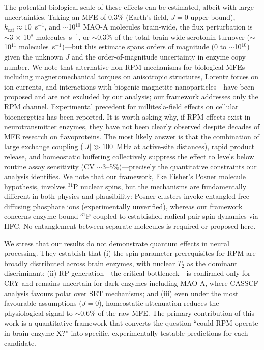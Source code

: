 \documentclass[11pt]{article}
\begin{document}
The potential biological scale of these effects can be estimated, albeit with large uncertainties. Taking an MFE of 0.3\% (Earth's field, $J = 0$ upper bound), $k_\mathrm{cat} \approx 10$~s$^{-1}$\cite{Edmondson2004main}, and $\sim$10$^{10}$ MAO-A molecules brain-wide, the flux perturbation is $\sim$3 $\times$ 10$^8$ molecules~s$^{-1}$, or $\sim$0.3\% of the total brain-wide serotonin turnover ($\sim$10$^{11}$ molecules~s$^{-1}$)---but this estimate spans orders of magnitude (0 to $\sim$10$^{10}$) given the unknown $J$ and the order-of-magnitude uncertainty in enzyme copy number. We note that alternative non-RPM mechanisms for biological MFEs---including magnetomechanical torques on anisotropic structures, Lorentz forces on ion currents, and interactions with biogenic magnetite nanoparticles---have been proposed and are not excluded by our analysis; our framework addresses only the RPM channel. Experimental precedent for millitesla-field effects on cellular bioenergetics has been reported\cite{Usselman2016}. It is worth asking why, if RPM effects exist in neurotransmitter enzymes, they have not been clearly observed despite decades of MFE research on flavoproteins. The most likely answer is that the combination of large exchange coupling ($|J| \gg 100$~MHz at active-site distances), rapid product release, and homeostatic buffering collectively suppress the effect to levels below routine assay sensitivity (CV $\sim$3--5\%)---precisely the quantitative constraints our analysis identifies. We note that our framework, like Fisher's Posner molecule hypothesis\cite{Fisher2015}, involves $^{31}$P nuclear spins, but the mechanisms are fundamentally different in both physics and plausibility: Posner clusters invoke entangled free-diffusing phosphate ions (experimentally unverified), whereas our framework concerns enzyme-bound $^{31}$P coupled to established radical pair spin dynamics via HFC. No entanglement between separate molecules is required or proposed here.

We stress that our results do not demonstrate quantum effects in neural processing. They establish that (i) the spin-parameter prerequisites for RPM are broadly distributed across brain enzymes, with nuclear $T_2$ as the dominant discriminant; (ii) RP generation---the critical bottleneck---is confirmed only for CRY and remains uncertain for dark enzymes including MAO-A, where CASSCF analysis favours polar over SET mechanisms; and (iii) even under the most favourable assumptions ($J = 0$), homeostatic attenuation reduces the physiological signal to $\sim$0.6\% of the raw MFE. The primary contribution of this work is a quantitative framework that converts the question ``could RPM operate in brain enzyme X?'' into specific, experimentally testable predictions for each candidate.
\end{document}
